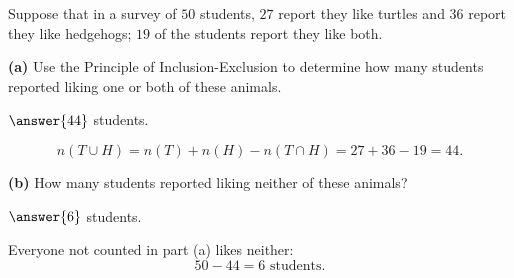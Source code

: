 \documentclass[12pt]{ximera}
\begin{document}
\begin{problem}
Suppose that in a survey of $50$ students, $27$ report they like turtles and $36$
report they like hedgehogs; $19$ of the students report they like both.

\begin{prompt}
\textbf{(a)} Use the Principle of Inclusion-Exclusion to determine how many students
reported liking one or both of these animals.

$\answer{44}$ students.

\begin{feedback}
\[
n(T\cup H)=n(T)+n(H)-n(T\cap H)=27+36-19=44.
\]
\end{feedback}
\end{prompt}

\begin{prompt}
\textbf{(b)} How many students reported liking neither of these animals?

$\answer{6}$ students.

\begin{feedback}
Everyone not counted in part (a) likes neither:
\[ 50-44=6 \text{ students.} \]
\end{feedback}
\end{prompt}
\end{problem}
\end{document}
